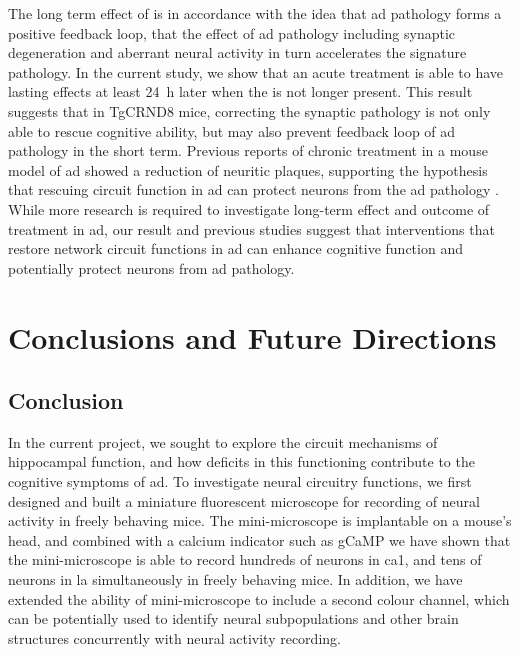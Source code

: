 The long term effect of \tglu{} is in accordance with the idea that \gls{ad} pathology forms a positive feedback loop, that the effect of \gls{ad} pathology including synaptic degeneration and aberrant neural activity in turn accelerates the signature pathology. In the current study, we show that an acute \tglu{} treatment is able to have lasting effects at least \SI{24}{\hour} later when the \tglu{} is not longer present. This result suggests that in TgCRND8 mice, correcting the synaptic pathology is not only able to rescue cognitive ability, but may also prevent feedback loop of \gls{ad} pathology in the short term. Previous reports of chronic \tglu{} treatment in a mouse model of \gls{ad} showed a reduction of neuritic plaques, supporting the hypothesis that rescuing circuit function in \gls{ad} can protect neurons from the \gls{ad} pathology \citep{dong15}. While more research is required to investigate long-term effect and outcome of \tglu{} treatment in \gls{ad}, our result and previous studies \citep{roy16, migues16, dong15} suggest that interventions that restore network circuit functions in \gls{ad} can enhance cognitive function and potentially protect neurons from \gls{ad} pathology. 

\chapter{Conclusions and Future Directions}

\section{Conclusion}

In the current project, we sought to explore the circuit mechanisms of hippocampal function, and how deficits in this functioning contribute to the cognitive symptoms of \gls{ad}. To investigate neural circuitry functions, we first designed and built a miniature fluorescent microscope for recording of neural activity in freely behaving mice. The mini-microscope is implantable on a mouse's head, and combined with a calcium indicator such as gCaMP we have shown that the mini-microscope is able to record hundreds of neurons in \gls{ca1}, and tens of neurons in \gls{la} simultaneously in freely behaving mice. In addition, we have extended the ability of mini-microscope to include a second colour channel, which can be potentially used to identify neural subpopulations and other brain structures concurrently with neural activity recording.

